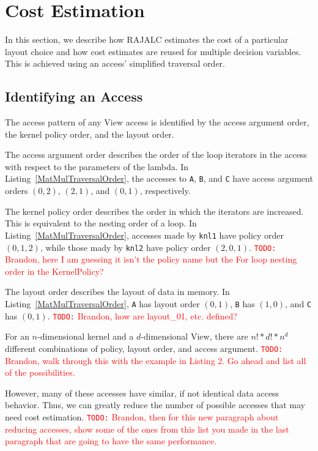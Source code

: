 \documentclass[sigconf, table]{acmart}
\newcommand{\todo}[1]{{\textcolor{red}{{\tt{TODO:}}\,\,#1 }}}
\begin{document}
\section{Cost Estimation}

In this section, we describe how RAJALC estimates the cost of a particular layout choice and how cost estimates are reused for multiple decision variables.
This is achieved using an access' simplified traversal order.

\subsection{Identifying an Access}
The access pattern of any View access is identified by the access argument order, the kernel policy order, and the layout order. 

The access argument order describes the order of the loop iterators in the access with respect to the parameters of the lambda. In Listing~\ref{MatMulTraversalOrder}, the accesses to \verb.A., \verb.B., and \verb.C. have access argument orders $(0,2)$, $(2,1)$, and $(0,1)$, respectively. 


The kernel policy order describes the order in which the iterators are increased. 
This is equivalent to the nesting order of a loop.
In Listing~\ref{MatMulTraversalOrder}, accesses made by \verb.knl1. have policy order $(0,1,2)$, while those mady by \verb.knl2. have policy order $(2,0,1)$.
\todo{Brandon, here I am guessing it isn't the policy name but the For loop nesting order in the KernelPolicy?}

The layout order describes the layout of data in memory. 
In Listing~\ref{MatMulTraversalOrder}, \verb.A. has layout order $(0,1)$, \verb.B. has $(1,0)$, and \verb.C. has $(0,1)$.
\todo{Brandon, how are layout\_01, etc. defined?}

For an $n$-dimensional kernel and a $d$-dimensional View, there are $n! * d! * n^d$ different combinations of policy, layout order, and access argument. 
\todo{Brandon, walk through this with the example in Listing 2.  Go ahead and list all of the possibilities.}

However, many of these accesses have similar, if not identical data access behavior. 
Thus, we can greatly reduce the number of possible accesses that may need cost estimation. 
\todo{Brandon, then for this new paragraph about reducing accesses, show some of the ones from
this list you made in the last paragraph that are going to have the same performance.}
\end{document}
